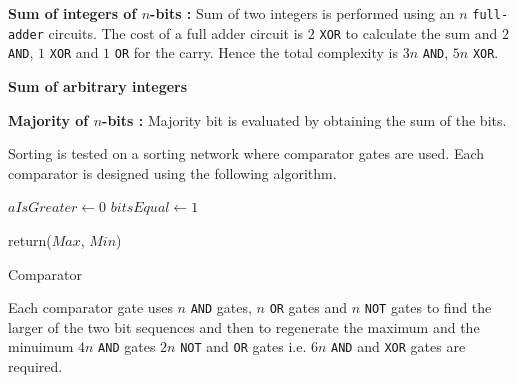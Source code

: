 \documentclass{acm_proc_article-sp}
\begin{document}
\textbf{Sum of integers of $n$-bits :} Sum of two integers is performed using an $n$ \texttt{full-adder} circuits. The cost of a full adder circuit is $2$ \texttt{XOR} to calculate the sum and $2$ \texttt{AND}, $1$ \texttt{XOR} and $1$ \texttt{OR} for the carry. Hence the total complexity is $3n$ \texttt{AND}, $5n$ \texttt{XOR}. 

\textbf{Sum of arbitrary integers}

\textbf{Majority of $n$-bits :} Majority bit is evaluated by obtaining the sum of the bits.

Sorting is tested on a sorting network where comparator gates are used. Each comparator is designed using the following algorithm. 


\linesnumbered

\begin{algorithm}[H]

 \SetVline



 $aIsGreater \leftarrow 0$\;
 $bitsEqual \leftarrow 1$\;

	




return($Max$, $Min$)

 \caption{Comparator\label{Code:algo}}

\end{algorithm}



Each comparator gate uses $n$ \texttt{AND} gates, $n$ \texttt{OR} gates and $n$ \texttt{NOT} gates to find the larger of the two bit sequences and then to regenerate the maximum and the minuimum $4n$ \texttt{AND} gates $2n$ \texttt{NOT} and \texttt{OR} gates i.e. $6n$ \texttt{AND} and \texttt{XOR} gates are required.  
\end{document}
